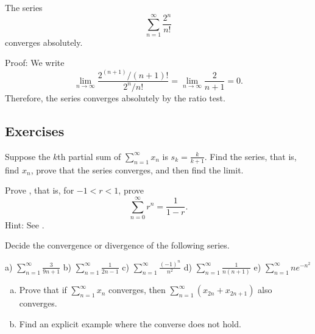 \begin{example}
The series
\begin{equation*}
\sum_{n=1}^\infty \frac{2^n}{n!}
\end{equation*}
converges absolutely.

Proof:  We write
\begin{equation*}
\lim_{n\to\infty} \frac{2^{(n+1)}/(n+1)!}{2^n / n!} =
\lim_{n\to\infty} \frac{2}{n+1} = 0 .
\end{equation*}
Therefore, the series converges absolutely by the ratio test.
\end{example}

\subsection{Exercises}

\begin{exercise}
Suppose the $k$th partial sum of $\displaystyle \sum_{n=1}^\infty x_n$ is $s_k = \frac{k}{k+1}$.
Find the series, that is, find $x_n$, prove that the series converges, and
then find the limit.
\end{exercise}

\begin{exercise} \label{geometric:exr}
Prove , that is, for $-1 < r < 1$, prove
\begin{equation*}
\sum_{n=0}^\infty r^n = \frac{1}{1-r} .
\end{equation*}
Hint:  See .
\end{exercise}

\begin{exercise}
Decide the convergence or divergence of the following series.

\medskip

\noindent
a)
$\displaystyle \sum_{n=1}^\infty \frac{3}{9n+1}$
\qquad
b)
$\displaystyle \sum_{n=1}^\infty \frac{1}{2n-1}$
\qquad
c)
$\displaystyle \sum_{n=1}^\infty \frac{{(-1)}^n}{n^2}$
\qquad
d)
$\displaystyle \sum_{n=1}^\infty \frac{1}{n(n+1)}$
\qquad
e)
$\displaystyle \sum_{n=1}^\infty n e^{-n^2}$
\end{exercise}

\begin{samepage}
\begin{exercise}
\leavevmode
\begin{enumerate}[a)]
\item Prove that if
$\displaystyle
\sum_{n=1}^\infty x_n
$
converges, then
$\displaystyle
\sum_{n=1}^\infty ( x_{2n} + x_{2n+1} )
$
also converges.
\item
Find an explicit example where the converse does not hold.
\end{enumerate}
\end{exercise}
\end{samepage}

